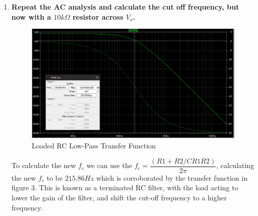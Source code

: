\documentclass[a4paper,11pt]{article}
\begin{document}
\begin{flushleft}
\begin{enumerate}
		\newpage
		\item %
			\textbf{Repeat the AC analysis and calculate the cut off frequency, but now with a $10k						\Omega$ resistor across $V_{o}$.} \\
			\begin{figure}[ht]
				\centering
				\includegraphics[width=\linewidth]{Loaded_RC_filter}
				\caption{Loaded RC Low-Pass Transfer Function}
			\end{figure}
			To calculate the new $f_{c}$ we can use the $f_{c}=\dfrac{(R1+R2/C R1 R2)}{2\pi}$, 							calculating the new $f_{c}$ to be $215.86Hz$ which is corroborated by the transfer function 				in figure 3. This is known as a terminated RC filter, with the load acting to lower the gain 			of the filter, and shift the cut-off frequency to a higher frequency.
		

\end{enumerate}
\end{flushleft}
\end{document}
